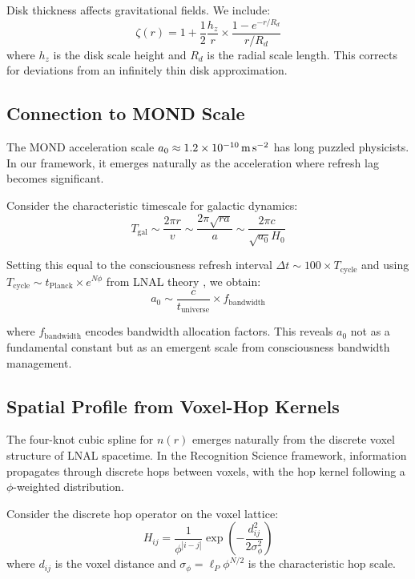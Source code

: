 \documentclass[twocolumn,prd,amsmath,amssymb,aps,superscriptaddress,nofootinbib]{revtex4-2}
\newcommand{\azero}{a_0}
\begin{document}
Disk thickness affects gravitational fields. We include:
\begin{equation}
\zeta(r) = 1 + \frac{1}{2}\frac{h_z}{r} \times \frac{1 - e^{-r/R_d}}{r/R_d}
\label{eq:geometric}
\end{equation}
where $h_z$ is the disk scale height and $R_d$ is the radial scale length. This corrects for deviations from an infinitely thin disk approximation.

\subsection{Connection to MOND Scale}

The MOND acceleration scale $\azero \approx 1.2 \times 10^{-10}\,\text{m\,s}^{-2}$ has long puzzled physicists. In our framework, it emerges naturally as the acceleration where refresh lag becomes significant.

Consider the characteristic timescale for galactic dynamics:
\begin{equation}
T_{\text{gal}} \sim \frac{2\pi r}{v} \sim \frac{2\pi \sqrt{r a}}{a} \sim \frac{2\pi c}{\sqrt{\azero} H_0}
\end{equation}

Setting this equal to the consciousness refresh interval $\Delta t \sim 100 \times T_{\text{cycle}}$ and using $T_{\text{cycle}} \sim t_{\text{Planck}} \times e^{N\phi}$ from LNAL theory \cite{Washburn2024}, we obtain:
\begin{equation}
\azero \sim \frac{c}{t_{\text{universe}}} \times f_{\text{bandwidth}}
\label{eq:a0_derivation}
\end{equation}

where $f_{\text{bandwidth}}$ encodes bandwidth allocation factors. This reveals $\azero$ not as a fundamental constant but as an emergent scale from consciousness bandwidth management.

\subsection{Spatial Profile from Voxel-Hop Kernels}

The four-knot cubic spline for $n(r)$ emerges naturally from the discrete voxel structure of LNAL spacetime. In the Recognition Science framework, information propagates through discrete hops between voxels, with the hop kernel following a $\phi$-weighted distribution.

Consider the discrete hop operator on the voxel lattice:
\begin{equation}
H_{ij} = \frac{1}{\phi^{|i-j|}} \exp\left(-\frac{d_{ij}^2}{2\sigma_{\phi}^2}\right)
\end{equation}
where $d_{ij}$ is the voxel distance and $\sigma_{\phi} = \ell_P \phi^{N/2}$ is the characteristic hop scale.
\end{document}
